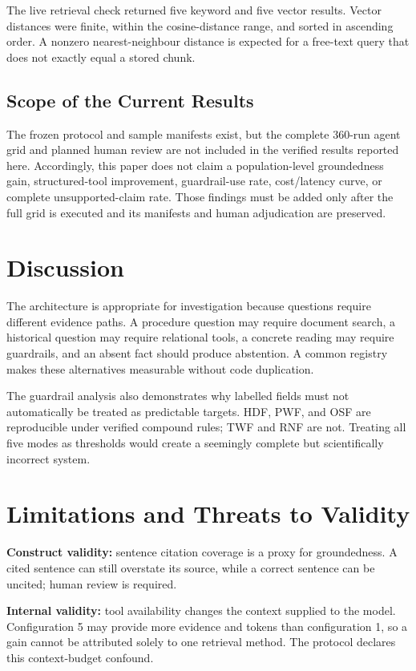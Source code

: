 \documentclass[conference]{IEEEtran}
\begin{document}
The live retrieval check returned five keyword and five vector results. Vector
distances were finite, within the cosine-distance range, and sorted in
ascending order. A nonzero nearest-neighbour distance is expected for a
free-text query that does not exactly equal a stored chunk.

\subsection{Scope of the Current Results}
The frozen protocol and sample manifests exist, but the complete 360-run
agent grid and planned human review are not included in the verified results
reported here. Accordingly, this paper does not claim a population-level
groundedness gain, structured-tool improvement, guardrail-use rate,
cost/latency curve, or complete unsupported-claim rate. Those findings must
be added only after the full grid is executed and its manifests and human
adjudication are preserved.

\section{Discussion}
The architecture is appropriate for investigation because questions require
different evidence paths. A procedure question may require document search,
a historical question may require relational tools, a concrete reading may
require guardrails, and an absent fact should produce abstention. A common
registry makes these alternatives measurable without code duplication.

The guardrail analysis also demonstrates why labelled fields must not
automatically be treated as predictable targets. HDF, PWF, and OSF are
reproducible under verified compound rules; TWF and RNF are not. Treating all
five modes as thresholds would create a seemingly complete but scientifically
incorrect system.

\section{Limitations and Threats to Validity}
\textbf{Construct validity:} sentence citation coverage is a proxy for
groundedness. A cited sentence can still overstate its source, while a
correct sentence can be uncited; human review is required.

\textbf{Internal validity:} tool availability changes the context supplied to
the model. Configuration 5 may provide more evidence and tokens than
configuration 1, so a gain cannot be attributed solely to one retrieval
method. The protocol declares this context-budget confound.
\end{document}
